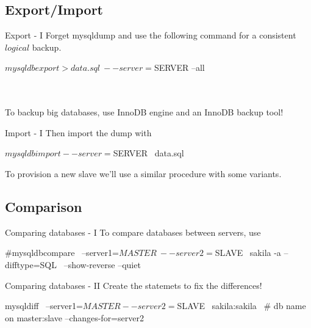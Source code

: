 \documentclass{beamer}[10]
\begin{document}
%
%
\subsection{Export/Import}

\begin{pyframe}{Export - I}
Forget mysqldump and use the following
command for a consistent $logical$ backup.
\begin{bashcode}
$ mysqldbexport > data.sql \
    --server=$SERVER
    --all
\end{bashcode}
\\ \\
{
\large
To backup big databases, use InnoDB engine and an InnoDB backup tool!
}
\end{pyframe}


\begin{pyframe}{Import - I}
Then import the dump with
\begin{bashcode}
$ mysqldbimport --server=$SERVER \
    data.sql
\end{bashcode}
To provision a new slave we'll use a similar
procedure with some variants.
\end{pyframe}


%
%
\subsection{Comparison}
\begin{pyframe}{Comparing databases - I}
To compare databases between servers, use
\begin{bashcode}
#mysqldbcompare \
    --server1=$MASTER \
    --server2=$SLAVE \
    sakila -a --difftype=SQL \
    --show-reverse --quiet
\end{bashcode}

\end{pyframe}


\begin{pyframe}{Comparing databases - II}
Create the statemets to fix the differences!
\begin{bashcode}
mysqldiff \
    --server1=$MASTER --server2=$SLAVE \
    sakila:sakila \ # db name on master:slave
    --changes-for=server2
\end{bashcode}
\end{pyframe}


%
%
\end{document}
